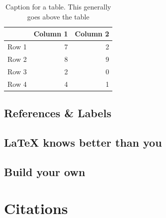 \documentclass{article}
\begin{document}
\begin{table}
    \centering
    \caption{Caption for a table. This generally goes above the table}
    \begin{tabular}{lrr}
      \toprule
      & Column 1 & Column 2 \\
      \midrule
      Row 1 & 7 & 2 \\
      Row 2 & 8 & 9 \\
      Row 3 & 2 & 0 \\
      Row 4 & 4 & 1 \\
      \bottomrule
    \end{tabular}
\end{table}

\subsection{References \& Labels}


\subsection{\LaTeX{} knows better than you}


\subsection{Build your own}


\section{Citations}


\printbibliography
\end{document}
